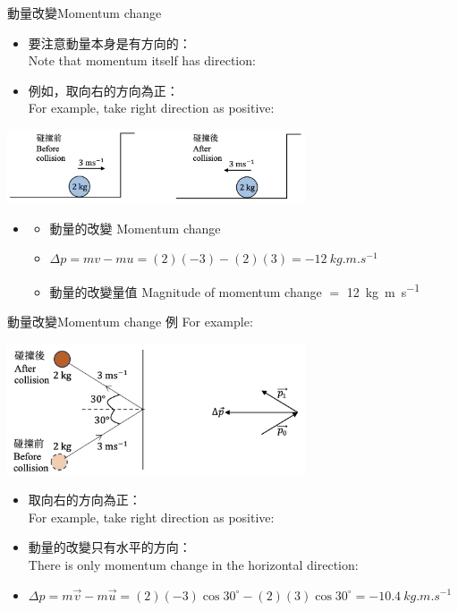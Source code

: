 \documentclass[13pt]{beamer}
\begin{document}
\begin{frame}{動量改變Momentum change}
    \begin{itemize}
        \item 要注意動量本身是有方向的：\\Note that momentum itself has direction:
        \item 例如，取向右的方向為正：\\For example, take right direction as positive:
    \end{itemize}
    {\par\centering
    \includegraphics[width=0.66\textwidth]{assets/e26d5e2e.png}
    \par}
    \begin{itemize}
        \item[]\begin{itemize}
                  \item 動量的改變 Momentum change
                  \item[] $\Delta p=mv-mu=(2)(-3)-(2)(3)=\qty{-12}{kg.m.s^{-1}}$
                  \item 動量的改變量值 Magnitude of momentum change $=$ \qty{12}{kg.m.s^{-1}}
              \end{itemize}
    \end{itemize}
\end{frame}

\begin{frame}{動量改變Momentum change}
    例 For example:
    {\par\centering
    \includegraphics[width=0.66\textwidth]{assets/4c46ae9d.png}
    \par}
    \begin{itemize}
        \item 取向右的方向為正：\\For example, take right direction as positive:
        \item 動量的改變只有水平的方向：\\ There is only momentum change in the horizontal direction:
        \item[] $\Delta p=m\vec{v}-m\vec{u}=(2)(-3)\cos 30^\circ-(2)(3)\cos 30^\circ=\qty{-10.4}{kg.m.s^{-1}}$
    \end{itemize}
\end{frame}
\end{document}

